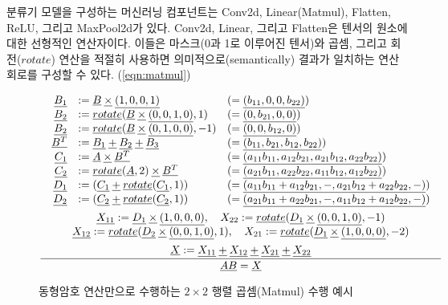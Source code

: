 \documentclass[a4paper, 11pt, chapterprefix=false]{report}
\newcommand{\ud}{\underline}
\newcommand{\htimes}{\ud{\times}}
\newcommand{\hplus}{\ud{+}}
\newcommand{\hrotate}{\ud{rotate}}
\begin{document}
분류기 모델을 구성하는 머신러닝 컴포넌트는 Conv2d, Linear(Matmul), Flatten,
ReLU, 그리고 MaxPool2d가 있다. Conv2d, Linear, 그리고 Flatten은 텐서의 원소에
대한 선형적인 연산자이다. 이들은 마스크(0과 1로 이루어진 텐서)와 곱셈, 그리고
회전($rotate$) 연산을 적절히 사용하면 의미적으로(semantically) 결과가 일치하는
연산 회로를 구성할 수 있다. (\autoref{eqn:matmul})
\begin{figure}[htbp]
  \begin{gather*}
    \frac
      {
        \begin{array}{c}
          \begin{array}{rll}
            \ud{B_1} &:= \ud{B} \: \htimes \: \ud{(1, 0, 0, 1)} &(=\ud{(b_{11}, 0, 0, b_{22})})\\
            \ud{B_2} &:= \hrotate(\ud{B} \: \htimes \: \ud{(0, 0, 1, 0)}, 1)  &(=\ud{(0, b_{21}, 0, 0)})\\
            \ud{B_2} &:= \hrotate(\ud{B} \: \htimes \: \ud{(0, 1, 0, 0)}, -1)  &(=\ud{(0, 0, b_{12}, 0)})\\
            \ud{B^T} &:= \ud{B_1} \:\hplus\: \ud{B_2} \:\hplus\: \ud{B_3} & (=\ud{(b_{11}, b_{21}, b_{12}, b_{22})})\\
            \ud{C_1} &:= \ud{A} \: \htimes \: \ud{B^T} &(=\ud{(a_{11}b_{11}, a_{12}b_{21}, a_{21}b_{12}, a_{22}b_{22})})\\
            \ud{C_2} &:= \hrotate(\ud{A}, 2) \: \htimes \: \ud{B^T} &(=\ud{(a_{21}b_{11}, a_{22}b_{22}, a_{11}b_{12}, a_{12}b_{22})})\\
            \ud{D_1} &:= (\ud{C_1} \: \hplus \: \hrotate(\ud{C_1}, 1)) &(=\ud{(a_{11}b_{11}+a_{12}b_{21},-,a_{21}b_{12}+a_{22}b_{22},-)}) \\
            \ud{D_2} &:= (\ud{C_2} \: \hplus \: \hrotate(\ud{C_2}, 1)) &(=\ud{(a_{21}b_{11}+a_{22}b_{21},-,a_{11}b_{12}+a_{12}b_{22},-)}) \\
          \end{array} \vspace{4px} \\
          \begin{array}{c}
            \ud{X_{11}} := \ud{D_1} \: \htimes \: \ud{(1, 0, 0, 0)},\quad X_{22} := \hrotate(\ud{D_1} \: \htimes \: \ud{(0, 0, 1, 0)}, -1)\\
            \ud{X_{12}} := \hrotate(\ud{D_2} \: \htimes \: \ud{(0, 0, 1, 0)}, 1),\quad X_{21} := \hrotate(\ud{D_1} \: \htimes \: \ud{(1, 0, 0, 0)}, -2) \vspace{4px}\\
            \ud{X} := \ud{X_{11}} \: \hplus \: \ud{X_{12}} \: \hplus \: \ud{X_{21}} \: \hplus \: \ud{X_{22}}
          \end{array}
        \end{array}
      }
      {\ud{AB} = \ud{X}}
  \end{gather*}
  \caption{동형암호 연산만으로 수행하는 $2\times 2$ 행렬 곱셈(Matmul) 수행 예시}
  \label{eqn:matmul}
\end{figure}
\end{document}
